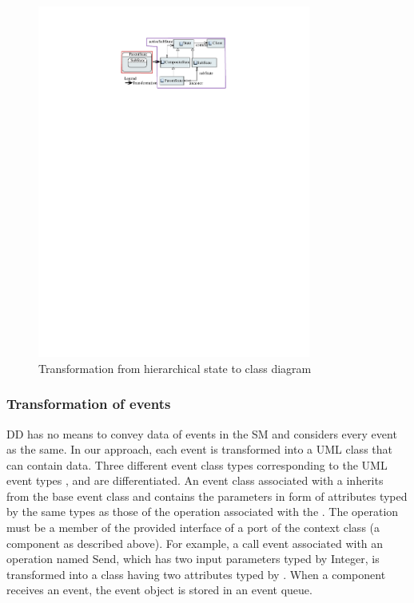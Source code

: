 \begin{figure}
\centering
\includegraphics[clip, trim=6.5cm 21.3cm 0.5cm 2.4cm, width=0.8\textwidth]{figures/compositepattern}
\caption{Transformation from hierarchical state to class diagram} 
\label{fig:hierarchical-class}
\end{figure}

\subsubsection{Transformation of events}
\label{subsec:events}
DD has no means to convey data of events in the SM and considers every event as the same. In our approach, each event is transformed into a UML class that can contain data. Three different event class types corresponding to the UML event types ,  and  are differentiated. An event class associated with a  inherits from the base event class and contains the parameters in form of attributes typed by the same types as those of the operation associated with the . The operation must be a member of the provided interface of a port of the context class (a component as described above). For example, a call event  associated with an operation named Send, which has two input parameters typed by Integer, is transformed into a class  having two attributes typed by . When a component receives an event, the event object is stored in an event queue.

